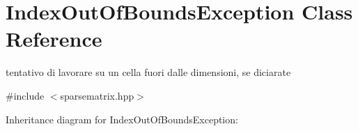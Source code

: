 \hypertarget{classIndexOutOfBoundsException}{}\section{Index\+Out\+Of\+Bounds\+Exception Class Reference}
\label{classIndexOutOfBoundsException}


tentativo di lavorare su un cella fuori dalle dimensioni, se diciarate  




{\ttfamily \#include $<$sparsematrix.\+hpp$>$}



Inheritance diagram for Index\+Out\+Of\+Bounds\+Exception\+:
